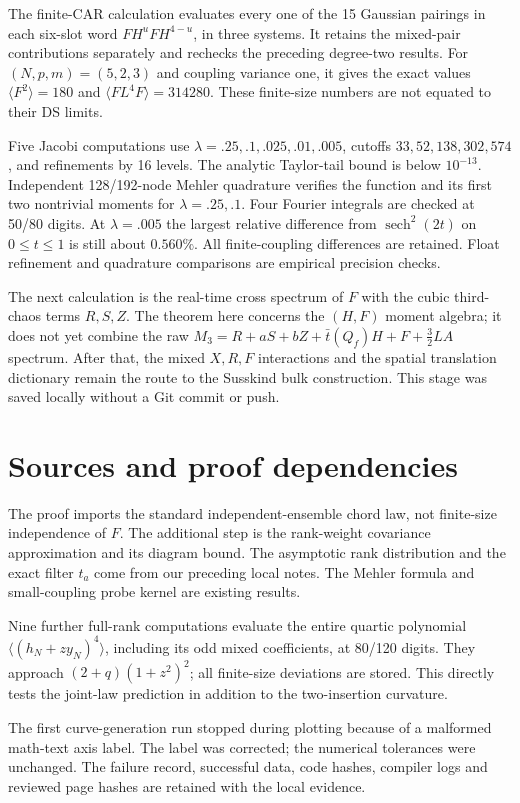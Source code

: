 \documentclass[11pt,a4paper]{article}
\newcommand{\av}[1]{\langle #1\rangle}
\DeclareMathOperator{\sech}{sech}
\begin{document}
The finite-CAR calculation evaluates every one of the 15 Gaussian
pairings in each six-slot word $FH^uFH^{4-u}$, in three systems.
It retains the mixed-pair contributions separately and rechecks
the preceding degree-two results. For $(N,p,m)=(5,2,3)$ and
coupling variance one, it gives the exact values
$\av{F^2}=180$ and $\av{FL^4F}=314280$.
These finite-size numbers are not equated to their DS limits.

Five Jacobi computations use $\lambda=.25,.1,.025,.01,.005$,
cutoffs $33,52,138,302,574$, and refinements by 16 levels.
The analytic Taylor-tail bound is below $10^{-13}$.
Independent 128/192-node Mehler quadrature verifies the function
and its first two nontrivial moments for $\lambda=.25,.1$.
Four Fourier integrals are checked at 50/80 digits.
At $\lambda=.005$ the largest relative difference from
$\sech^2(2t)$ on $0\leq t\leq1$ is still about $0.560\%$.
All finite-coupling differences are retained. Float refinement
and quadrature comparisons are empirical precision checks.

The next calculation is the real-time cross spectrum of $F$
with the cubic third-chaos terms $R,S,Z$. The theorem here concerns
the $(H,F)$ moment algebra; it does not yet combine the raw
$M_3=R+aS+bZ+\bar t(Q_f)H+F+\tfrac32LA$ spectrum. After that,
the mixed $X,R,F$ interactions and the spatial translation
dictionary remain the route to the Susskind bulk construction.
This stage was saved locally without a Git commit or push.

\newpage
\section*{Sources and proof dependencies}
The proof imports the standard independent-ensemble chord law,
not finite-size independence of $F$. The additional step is the
rank-weight covariance approximation and its diagram bound.
The asymptotic rank distribution and the exact filter $t_a$
come from our preceding local notes. The Mehler formula and
small-coupling probe kernel are existing results.

Nine further full-rank computations evaluate the entire quartic
polynomial $\av{(h_N+z y_N)^4}$, including its odd mixed
coefficients, at 80/120 digits. They approach
$(2+q)(1+z^2)^2$; all finite-size deviations are stored.
This directly tests the joint-law prediction in addition to the
two-insertion curvature.

The first curve-generation run stopped during plotting because
of a malformed math-text axis label. The label was corrected;
the numerical tolerances were unchanged. The failure record,
successful data, code hashes, compiler logs and reviewed page
hashes are retained with the local evidence.
\end{document}
